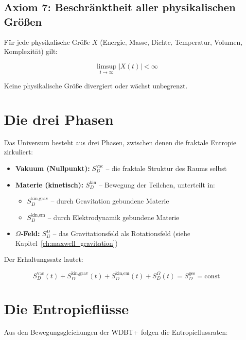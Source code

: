 \subsection{Axiom 7: Beschränktheit aller physikalischen Größen}
\label{sub:entropie_axiom7}

Für jede physikalische Größe \( X \) (Energie, Masse, Dichte, Temperatur, Volumen, Komplexität) gilt:

\[
\limsup_{t \to \infty} |X(t)| < \infty
\]

Keine physikalische Größe divergiert oder wächst unbegrenzt.

\section{Die drei Phasen}
\label{sec:entropie_phasen}

Das Universum besteht aus drei Phasen, zwischen denen die fraktale Entropie zirkuliert:

\begin{itemize}
    \item \textbf{Vakuum (Nullpunkt):} \( S_D^{\text{vac}} \) – die fraktale Struktur des Raums selbst
    \item \textbf{Materie (kinetisch):} \( S_D^{\text{kin}} \) – Bewegung der Teilchen, unterteilt in:
        \begin{itemize}
            \item \( S_D^{\text{kin,grav}} \) – durch Gravitation gebundene Materie
            \item \( S_D^{\text{kin,em}} \) – durch Elektrodynamik gebundene Materie
        \end{itemize}
    \item \textbf{\( \Omega \)-Feld:} \( S_D^{\Omega} \) – das Gravitationsfeld als Rotationsfeld (siehe Kapitel~\ref{ch:maxwell_gravitation})
\end{itemize}

Der Erhaltungssatz lautet:

\[
S_D^{\text{vac}}(t) + S_D^{\text{kin,grav}}(t) + S_D^{\text{kin,em}}(t) + S_D^{\Omega}(t) = S_D^{\text{ges}} = \text{const}
\]

\section{Die Entropieflüsse}
\label{sec:entropie_fluesse}

Aus den Bewegungsgleichungen der WDBT+ folgen die Entropieflussraten:

